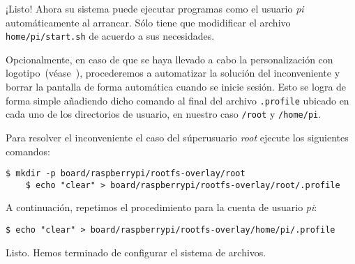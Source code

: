 \noindent
¡Listo! Ahora su sistema puede ejecutar programas como el usuario \emph{pi} automáticamente al arrancar.
Sólo tiene que modidificar el archivo \texttt{home/pi/start.sh} de acuerdo a sus necesidades.

\bigskip{}

Opcionalmente, en caso de que se haya llevado a cabo la personalización con logotipo~(véase~), procederemos a automatizar la solución del inconveniente y borrar la pantalla de forma automática cuando se inicie sesión.
Esto se logra de forma simple añadiendo dicho comando al final del archivo \texttt{.profile} ubicado en cada uno de los directorios de usuario, en nuestro caso \texttt{/root} y \texttt{/home/pi}.

\begin{samepage}
Para resolver el inconveniente el caso del súperusuario \emph{root} ejecute los siguientes comandos:
\begin{Verbatim}[gobble=1]
	$ mkdir -p board/raspberrypi/rootfs-overlay/root
	$ echo "clear" > board/raspberrypi/rootfs-overlay/root/.profile
\end{Verbatim}
\end{samepage}

\begin{samepage}
A continuación, repetimos el procedimiento para la cuenta de usuario \emph{pi}:

\begin{Verbatim}[gobble=1]
	$ echo "clear" > board/raspberrypi/rootfs-overlay/home/pi/.profile
\end{Verbatim}
\end{samepage}

Listo.
Hemos terminado de configurar el sistema de archivos.
